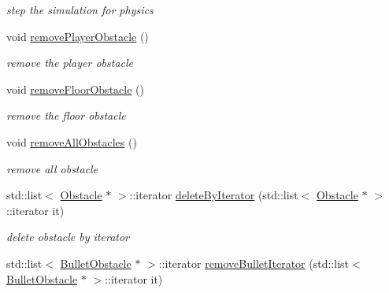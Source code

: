 \begin{DoxyCompactItemize}
\begin{DoxyCompactList}\small\item\em step the simulation for physics \end{DoxyCompactList}\item 
void \hyperlink{class_n_c_t_u_1_1_obstacle_manager_aacd7dbd0b2c851691d1f36582d7779dd}{remove\+Player\+Obstacle} ()\hypertarget{class_n_c_t_u_1_1_obstacle_manager_aacd7dbd0b2c851691d1f36582d7779dd}{}\label{class_n_c_t_u_1_1_obstacle_manager_aacd7dbd0b2c851691d1f36582d7779dd}

\begin{DoxyCompactList}\small\item\em remove the player obstacle \end{DoxyCompactList}\item 
void \hyperlink{class_n_c_t_u_1_1_obstacle_manager_a5c37bc1f270352a9df4c0e95642ff51d}{remove\+Floor\+Obstacle} ()\hypertarget{class_n_c_t_u_1_1_obstacle_manager_a5c37bc1f270352a9df4c0e95642ff51d}{}\label{class_n_c_t_u_1_1_obstacle_manager_a5c37bc1f270352a9df4c0e95642ff51d}

\begin{DoxyCompactList}\small\item\em remove the floor obstacle \end{DoxyCompactList}\item 
void \hyperlink{class_n_c_t_u_1_1_obstacle_manager_abe8ff3d60b7953e8540953882646a652}{remove\+All\+Obstacles} ()\hypertarget{class_n_c_t_u_1_1_obstacle_manager_abe8ff3d60b7953e8540953882646a652}{}\label{class_n_c_t_u_1_1_obstacle_manager_abe8ff3d60b7953e8540953882646a652}

\begin{DoxyCompactList}\small\item\em remove all obstacle \end{DoxyCompactList}\item 
std\+::list$<$ \hyperlink{class_n_c_t_u_1_1_obstacle}{Obstacle} $\ast$ $>$\+::iterator \hyperlink{class_n_c_t_u_1_1_obstacle_manager_a260911f02f5425bf9f22973bcc065a42}{delete\+By\+Iterator} (std\+::list$<$ \hyperlink{class_n_c_t_u_1_1_obstacle}{Obstacle} $\ast$ $>$\+::iterator it)\hypertarget{class_n_c_t_u_1_1_obstacle_manager_a260911f02f5425bf9f22973bcc065a42}{}\label{class_n_c_t_u_1_1_obstacle_manager_a260911f02f5425bf9f22973bcc065a42}

\begin{DoxyCompactList}\small\item\em delete obstacle by iterator \end{DoxyCompactList}\item 
std\+::list$<$ \hyperlink{class_n_c_t_u_1_1_bullet_obstacle}{Bullet\+Obstacle} $\ast$ $>$\+::iterator \hyperlink{class_n_c_t_u_1_1_obstacle_manager_a6ee337af765406950207541982ea0f73}{remove\+Bullet\+Iterator} (std\+::list$<$ \hyperlink{class_n_c_t_u_1_1_bullet_obstacle}{Bullet\+Obstacle} $\ast$ $>$\+::iterator it)\hypertarget{class_n_c_t_u_1_1_obstacle_manager_a6ee337af765406950207541982ea0f73}{}\label{class_n_c_t_u_1_1_obstacle_manager_a6ee337af765406950207541982ea0f73}


\end{DoxyCompactItemize}
